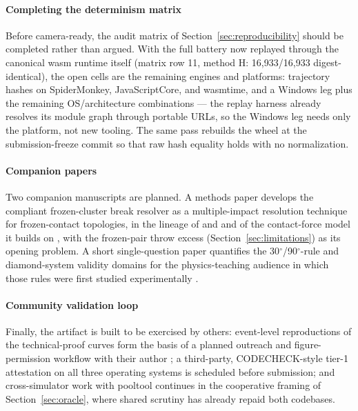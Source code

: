 \paragraph{Completing the determinism matrix}
Before camera-ready, the audit matrix of
Section~\ref{sec:reproducibility} should be completed rather than
argued. With the full battery now replayed through the canonical wasm
runtime itself (matrix row 11, method H: 16{,}933/16{,}933
digest-identical), the open cells are the remaining engines and
platforms: trajectory hashes on SpiderMonkey, JavaScriptCore, and
wasmtime, and a Windows leg plus the remaining OS/architecture
combinations --- the replay harness already resolves its module graph
through portable  URLs, so the Windows leg needs only the
platform, not new tooling. The same pass rebuilds the wheel at the
submission-freeze commit so that raw hash equality holds with no
normalization.

\paragraph{Companion papers}
Two companion manuscripts are planned. A methods paper develops the
compliant frozen-cluster break resolver as a multiple-impact resolution
technique for frozen-contact topologies, in the lineage of
\citet{gismerosmoreno2022multiple} and \citet{cross2023oblique} and of
the contact-force model it builds on \citep{lankarani1994continuous},
with the frozen-pair throw excess
(Section~\ref{sec:limitations}) as its opening problem. A short
single-question paper quantifies the 30$^\circ$/90$^\circ$-rule and
diamond-system validity domains for the physics-teaching audience in
which those rules were first studied experimentally
\citep{bayes1963collision,wallace1988billiard,mathavan2009highspeed}.

\paragraph{Community validation loop}
Finally, the artifact is built to be exercised by others: event-level
reproductions of the technical-proof curves form the basis of a planned
outreach and figure-permission workflow with their author
\citep{alciatore_tp_catalog}; a third-party, CODECHECK-style tier-1
attestation on all three operating systems is scheduled before
submission; and cross-simulator work with pooltool
\citep{kiefl2024pooltool} continues in the cooperative framing of
Section~\ref{sec:oracle}, where shared scrutiny has already repaid both
codebases.
